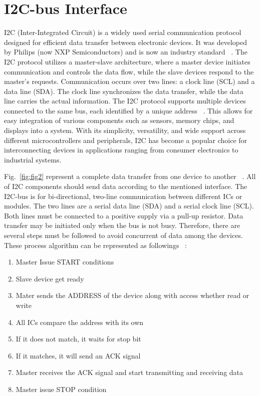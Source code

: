 \section{I2C-bus Interface}
I2C (Inter-Integrated Circuit) is a widely used serial communication protocol designed for efficient data transfer between electronic devices. It was developed by Philips (now NXP Semiconductors) and is now an industry standard~\cite{noauthor_i2c-bus_2021}
. The I2C protocol utilizes a master-slave architecture, where a master device initiates communication and controls the data flow, while the slave devices respond to the master's requests. Communication occurs over two lines: a clock line (SCL) and a data line (SDA). The clock line synchronizes the data transfer, while the data line carries the actual information. The I2C protocol supports multiple devices connected to the same bus, each identified by a unique address~\cite{valdez_understanding_2015}
. This allows for easy integration of various components such as sensors, memory chips, and displays into a system. With its simplicity, versatility, and wide support across different microcontrollers and peripherals, I2C has become a popular choice for interconnecting devices in applications ranging from consumer electronics to industrial systems.

Fig.~\ref{fig:fig2} represent a complete data transfer from one device to another~\cite{noauthor_i2c-bus_2021}
. All of I2C components should send data according to the mentioned interface. The I2C-bus is for bi-directional, two-line communication between different ICs or modules. The two lines are a serial data line (SDA) and a serial clock line (SCL). Both lines must be connected to a positive supply via a pull-up resistor. Data transfer may be initiated only when the bus is not busy. Therefore, there are several steps must be followed to avoid concurrent of data among the devices. These process algorithm can be represented as followings~\cite{mankar2014review}
:
\begin{enumerate}
	\item Master Issue START conditions
	\item Slave device get ready
	\item Mater sends the ADDRESS of the device along with access whether read or write
	\item All ICs compare the address with its own
	\item If it does not match, it waits for stop bit
	\item If it matches, it will send an ACK signal
	\item Master receives the ACK signal and start transmitting and receiving data 
	\item Master issue STOP condition
\end{enumerate}

